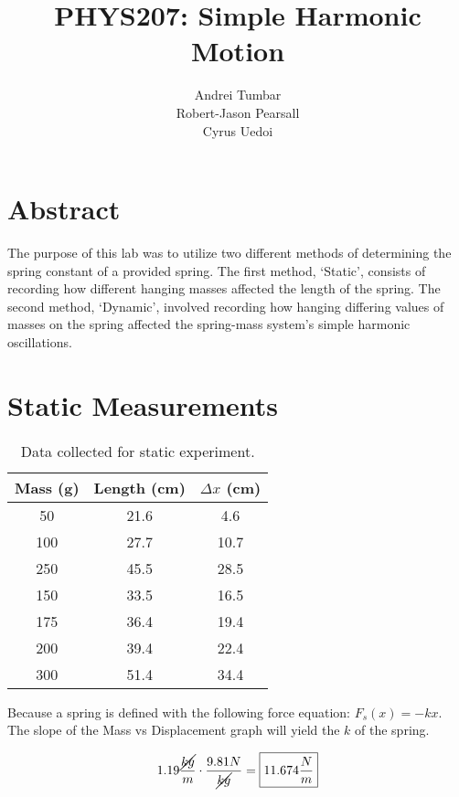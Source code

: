 \documentclass{article}
\title{PHYS207: Simple Harmonic Motion} %
\author{Andrei Tumbar \\
Robert-Jason Pearsall \\
Cyrus Uedoi} %
\date{}
\begin{document}
\maketitle


\section*{Abstract} %

The purpose of this lab was to utilize two different methods of determining the spring constant of a provided spring. The first method, ‘Static’, consists of recording how different hanging masses affected the length of the spring. The second method, ‘Dynamic’, involved recording how hanging differing values of masses on the spring affected the spring-mass system’s simple harmonic oscillations.

\section{Static Measurements}

\begin{wraptable}{r}{5.5cm}
\caption{Data collected for static experiment.}
\begin{tabular}{c|c|c}
Mass (g) & Length (cm) & $\Delta x$ (cm) \\\hline
50 & 21.6 & 4.6 \\
100 & 27.7 & 10.7 \\
250 & 45.5 & 28.5 \\
150 & 33.5 & 16.5 \\
175 & 36.4 & 19.4 \\
200 & 39.4 & 22.4 \\
300 & 51.4 & 34.4 \\
\end{tabular}
\end{wraptable}

Because a spring is defined with the following force equation: $F_s(x) = -kx$. The slope of the Mass vs Displacement graph will yield the $k$ of the spring.

\[
1.19 \frac{\cancel{kg}}{m} \cdot \frac{9.81 N}{\cancel{kg}} = \boxed{11.674 \frac{N}{m}} 
\]

\datatable
\end{document}
